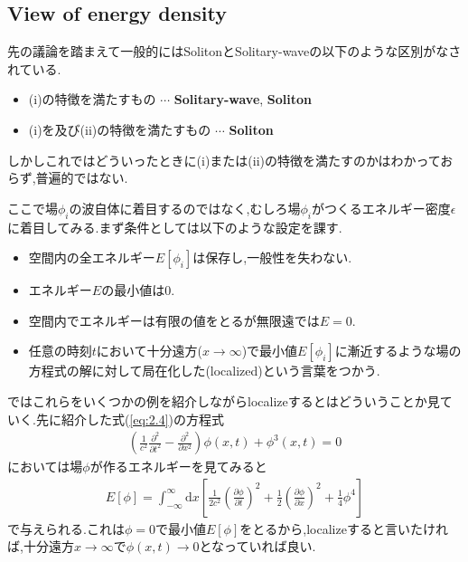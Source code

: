 \documentclass[dvipdfmx,11pt,a4paper,oneside,openany]{jsbook}
\begin{document}
\subsection{View of energy density}
先の議論を踏まえて一般的にはSolitonとSolitary-waveの以下のような区別がなされている.
\begin{screen}
    \begin{itemize}
        \item (i)の特徴を満たすもの $\cdots$ {\bf Solitary-wave}, {\bf Soliton}
        \item (i)を及び(ii)の特徴を満たすもの $\cdots$ {\bf Soliton}
    \end{itemize}
\end{screen}

しかしこれではどういったときに(i)または(ii)の特徴を満たすのかはわかっておらず,普遍的ではない.

ここで場$\phi_i$の波自体に着目するのではなく,むしろ場$\phi_i$がつくるエネルギー密度$\epsilon$に着目してみる.まず条件としては以下のような設定を課す.
\begin{itemize}
    \item 空間内の全エネルギー$E[\phi_i]$は保存し,一般性を失わない.
    \item エネルギー$E$の最小値は0.
    \item 空間内でエネルギーは有限の値をとるが無限遠では$E=0$.
    \item 任意の時刻$t$において十分遠方($x\rightarrow \infty$)で最小値$E[\phi_i]$に漸近するような場の方程式の解に対して局在化した(localized)という言葉をつかう.
\end{itemize}
ではこれらをいくつかの例を紹介しながらlocalizeするとはどういうことか見ていく.先に紹介した式(\ref{eq:2.4})の方程式
\begin{align*}
    \left(\frac{1}{c^{2}} \frac{\partial^{2}}{\partial t^{2}}-\frac{\partial^{2}}{\partial x^{2}}\right) \phi(x, t)+\phi^{3}(x, t)=0
\end{align*}
においては場$\phi$が作るエネルギーを見てみると
\begin{align}
    E[\phi]=\int_{-\infty}^{\infty} \mathrm{d} x\left[\frac{1}{2 c^{2}}\left(\frac{\partial \phi}{\partial t}\right)^{2}+\frac{1}{2}\left(\frac{\partial \phi}{\partial x}\right)^{2}+\frac{1}{4} \phi^{4}\right]
\end{align}
で与えられる.これは$\phi=0$で最小値$E[\phi]$をとるから,localizeすると言いたければ,十分遠方$x\rightarrow \infty$で$\phi(x,t)\rightarrow 0$となっていれば良い.\\
\end{document}
